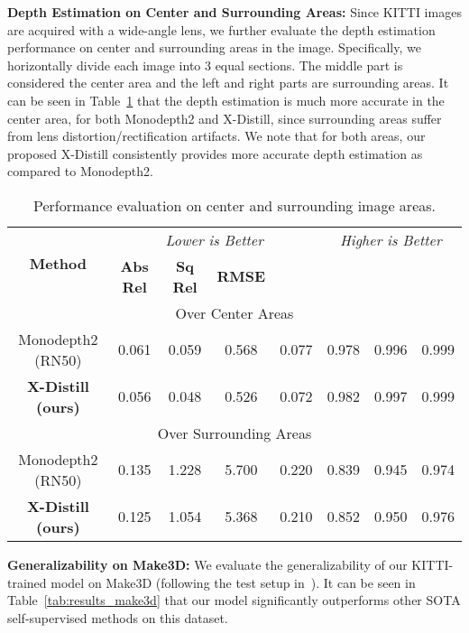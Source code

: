 \documentclass{bmvc2k}
\newcommand{\rev}{}
\begin{document}
\vspace{1pt}
\noindent \textbf{Depth Estimation on Center and Surrounding Areas:} \rev{Since KITTI images are acquired with a wide-angle lens, we further evaluate the depth estimation performance on center and surrounding areas in the image. Specifically, we horizontally divide each image into 3 equal sections. The middle part is considered the center area and the left and right parts are surrounding areas. It can be seen in Table~\ref{tab:eval_center_vs_side} that the depth estimation is much more accurate in the center area, for both Monodepth2 and X-Distill, since surrounding areas suffer from lens distortion/rectification artifacts. We note that for both areas, our proposed X-Distill consistently provides more accurate depth estimation as compared to Monodepth2.}
\begin{table}[h!]
\vspace{-8pt}
\centering
\scriptsize
\begin{tabular}[h]{ c  | c  c  c  c | c  c  c}
\hline
\multirow{2}{*}{\textbf{Method}} &\multicolumn{4}{c|}{\it Lower is Better} &\multicolumn{3}{c}{\it Higher is Better} \\
&{\bf Abs Rel} &{\bf Sq Rel} &{\bf RMSE} &{\bf } &{\bf} &{\bf} &{\bf} \\
\hline
\multicolumn{8}{c}{Over Center Areas}\\ \hline
Monodepth2 (RN50)              &0.061 &0.059 &0.568 &0.077 &0.978 &0.996 &0.999 \\
\textbf{X-Distill (ours)}   &0.056 &0.048 &0.526 &0.072 &0.982 & 0.997 & 0.999 \\ \hline
\multicolumn{8}{c}{Over Surrounding Areas}\\ \hline
Monodepth2 (RN50)           &0.135 &1.228 &5.700 &0.220 &0.839 &0.945 &0.974 \\
\textbf{X-Distill (ours)}    &0.125 &1.054 &5.368 &0.210 &0.852 &0.950 &0.976          \\
\hline
\end{tabular}
\vspace{2pt}
\caption{\small Performance evaluation on center and surrounding image areas.}
\label{tab:eval_center_vs_side}
\vspace{-8pt}
\end{table}


\vspace{1pt}
\noindent \textbf{Generalizability on Make3D:}
We evaluate the generalizability of our KITTI-trained model on Make3D (following the test setup in~\cite{godard2019digging}). It can be seen in Table~\ref{tab:results_make3d} that our model significantly outperforms other SOTA self-supervised methods on this dataset.
\end{document}
